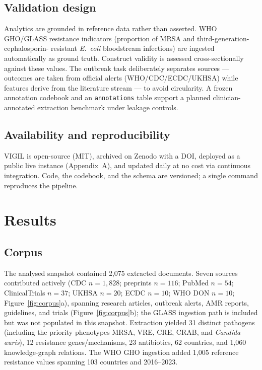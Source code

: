 \documentclass[10pt]{article}
\begin{document}
\subsection{Validation design}
Analytics are grounded in reference data rather than asserted. WHO GHO/GLASS
resistance indicators (proportion of MRSA and third-generation-cephalosporin-
resistant \textit{E.\ coli} bloodstream infections) are ingested automatically as
ground truth. Construct validity is assessed cross-sectionally against these values.
The outbreak task deliberately separates sources --- outcomes are taken from
official alerts (WHO/CDC/ECDC/UKHSA) while features derive from the literature
stream --- to avoid circularity. A frozen annotation codebook and an
\texttt{annotations} table support a planned clinician-annotated extraction
benchmark under leakage controls.

\subsection{Availability and reproducibility}
VIGIL is open-source (MIT), archived on Zenodo with a DOI, deployed as a public
live instance (Appendix~A), and updated daily at no cost via continuous integration.
Code, the codebook, and the schema are versioned; a single command reproduces the
pipeline.

\section{Results}

\subsection{Corpus}
The analysed snapshot contained 2{,}075 extracted documents. Seven sources
contributed actively (CDC $n=1{,}828$; preprints $n=116$; PubMed $n=54$;
ClinicalTrials $n=37$; UKHSA $n=20$; ECDC $n=10$; WHO DON $n=10$; Figure~\ref{fig:corpus}a),
spanning research articles, outbreak alerts, AMR reports, guidelines, and trials
(Figure~\ref{fig:corpus}b); the GLASS ingestion path is included but was not
populated in this snapshot. Extraction yielded 31 distinct pathogens (including the
priority phenotypes MRSA, VRE, CRE, CRAB, and \textit{Candida auris}), 12 resistance
genes/mechanisms, 23 antibiotics, 62 countries, and 1{,}060 knowledge-graph
relations. The WHO GHO ingestion added 1{,}005 reference resistance values spanning
103 countries and 2016--2023.
\end{document}
